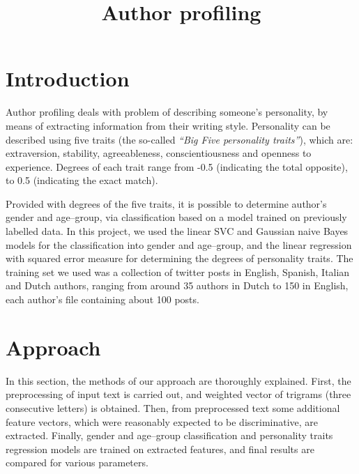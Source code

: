 \documentclass[10pt, a4paper]{article}
\title{Author profiling}
\begin{document}
\maketitleabstract

\section{Introduction}

Author profiling deals with problem of describing someone's personality, by means of extracting information from their writing style.
Personality can be described using five traits (the so-called \textit{``Big Five personality traits''}), which are: extraversion, stability, agreeableness, conscientiousness and openness to experience.
Degrees of each trait range from -0.5 (indicating the total opposite), to 0.5 (indicating the exact match).

Provided with degrees of the five traits, it is possible to determine author's gender and age--group, via classification based on a model trained on previously labelled data.
In this project, we used the linear SVC and Gaussian naive Bayes models for the classification into gender and age--group, and the linear regression with squared error measure for determining the degrees of personality traits.
The training set we used was a collection of twitter posts in English, Spanish, Italian and Dutch authors, ranging from around 35 authors in Dutch to 150 in English, each author's file containing about 100 posts.

\section{Approach}

In this section, the methods of our approach are thoroughly explained.
First, the preprocessing of input text is carried out, and weighted vector of trigrams (three consecutive letters) is obtained.
Then, from preprocessed text some additional feature vectors, which were reasonably expected to be discriminative, are extracted.
Finally, gender and age--group classification and personality traits regression models are trained on extracted features, and final results are compared for various parameters.
\end{document}
